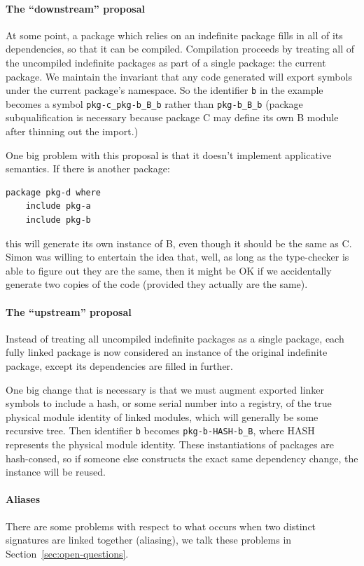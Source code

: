 \documentclass{article}
\begin{document}
\paragraph{The ``downstream'' proposal}  At some point, a package which
relies on an indefinite package fills in all of its dependencies, so
that it can be compiled.  Compilation proceeds by treating all of the
uncompiled indefinite packages as part of a single package: the current
package.  We maintain the invariant that any code generated will export
symbols under the current package's namespace.  So the identifier
\verb|b| in the example becomes a symbol \verb|pkg-c_pkg-b_B_b| rather
than \verb|pkg-b_B_b| (package subqualification is necessary because
package C may define its own B module after thinning out the import.)

One big problem with this proposal is that it doesn't implement applicative
semantics.  If there is another package:

\begin{verbatim}
package pkg-d where
    include pkg-a
    include pkg-b
\end{verbatim}

this will generate its own instance of B, even though it should be the same
as C.  Simon was willing to entertain the idea that, well, as long as the
type-checker is able to figure out they are the same, then it might be OK
if we accidentally generate two copies of the code (provided they actually
are the same).

\paragraph{The ``upstream'' proposal}  Instead of treating all
uncompiled indefinite packages as a single package, each fully linked
package is now considered an instance of the original indefinite
package, except its dependencies are filled in further.

One big change that is necessary is that we must augment exported
linker symbols to include a hash, or some serial number into a registry,
of the true physical module identity of linked modules, which will
generally be some recursive tree.  Then identifier \verb|b| becomes
\verb|pkg-b-HASH-b_B|, where HASH represents the physical module
identity.  These instantiations of packages are hash-consed, so if
someone else constructs the exact same dependency change, the instance
will be reused.

\paragraph{Aliases} There are some problems with respect to what occurs when two
distinct signatures are linked together (aliasing), we talk these problems in
Section~\ref{sec:open-questions}.
\end{document}
